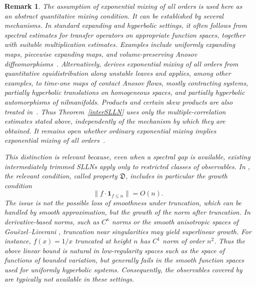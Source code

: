 \documentclass[11pt,twoside,a4paper,reqno]{amsart}
\newtheorem{remark}[theorem]{Remark}
\def\one{{\mathbf{1}}}
\begin{document}
\begin{remark}\label{specrem}
The assumption of exponential mixing of all orders is used here as an abstract quantitative mixing condition. It can be established by several mechanisms. In standard expanding and hyperbolic settings, it often follows from spectral estimates for transfer operators on appropriate function spaces, together with suitable multiplication estimates. Examples include uniformly expanding maps, piecewise expanding maps, and volume-preserving Anosov diffeomorphisms~\cite{Bow08,Via97}. Alternatively, \cite[Theorem~A.3]{DFL22} derives exponential mixing of all orders from quantitative equidistribution along unstable leaves and applies, among other examples, to time-one maps of contact Anosov flows, mostly contracting systems, partially hyperbolic translations on homogeneous spaces, and partially hyperbolic automorphisms of nilmanifolds. Products and certain skew products are also treated in~\cite{DFL22}. Thus Theorem~\ref{interSLLN} uses only the multiple-correlation estimates stated above, independently of the mechanism by which they are obtained. It remains open whether ordinary exponential mixing implies exponential mixing of all orders~\cite[Question~1.7]{DKRH24}.





This distinction is relevant because, even when a spectral gap is available, existing intermediately trimmed SLLNs apply only to restricted classes of observables. In \cite{KessSchiSLLN}, the relevant condition, called property $\mathfrak{D}$, includes in particular the growth condition
$$\|f \cdot \one_{f \leq n}\| = O(n).$$
The issue is not the possible loss of smoothness under truncation, which can be handled by smooth approximation, but the growth of the norm after truncation. In derivative-based norms, such as $C^\kappa$ norms or the smooth anisotropic spaces of Gou\"{e}zel--Liverani \cite{GL06}, truncation near singularities may yield superlinear growth. For instance, $f(x)=1/x$ truncated at height $n$ has $C^1$ norm of order $n^2$. Thus the above linear bound is natural in low-regularity spaces such as the space of functions of bounded variation, but generally fails in the smooth function spaces used for uniformly hyperbolic systems. Consequently, the observables covered by \cite{KessSchiSLLN} are typically not available in these settings.
\end{remark}
\end{document}
